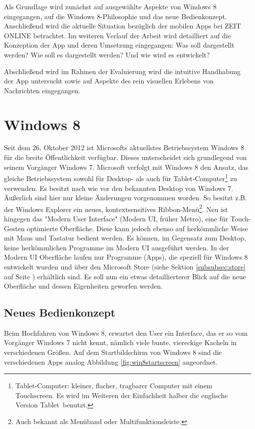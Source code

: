 \documentclass[12pt,a4paper,bibtotoc,abstracton]{scrartcl}
\begin{document}
Als Grundlage wird zunächst auf ausgewählte Aspekte von Windows 8 eingegangen, auf die Windows 8-Philosophie und das neue Bedienkonzept. Anschließend wird die aktuelle Situation bezüglich der mobilen Apps bei ZEIT ONLINE betrachtet. Im weiteren Verlauf der Arbeit wird detailliert auf die Konzeption der App und deren Umsetzung eingegangen: Was soll dargestellt werden? Wie soll es dargestellt werden? Und wie wird es entwickelt?

Abschließend wird im Rahmen der Evaluierung wird die intuitive Handhabung der App untersucht sowie auf Aspekte des rein visuellen Erlebens von Nachrichten eingegangen.



\newpage
\section{Windows 8}
\label{sec:windows8}
Seit dem 26. Oktober 2012 ist Microsofts aktuellstes Betriebssystem Windows 8 für die breite Öffentlichkeit verfügbar. Dieses unterscheidet sich grundlegend von seinem Vorgänger Windows 7. Microsoft verfolgt mit Windows 8 den Ansatz, das gleiche Betriebssystem sowohl für Desktop- als auch für Tablet-Computer\footnote{Tablet-Computer: kleiner, flacher, tragbarer Computer mit einem Touchscreen. Es wird im Weiteren der Einfachheit halber die englische Version \glqq Tablet\grqq\ benutzt.} zu verwenden. Es besitzt nach wie vor den bekannten Desktop von Windows 7. Äußerlich sind hier nur kleine Änderungen vorgenommen worden. So besitzt z.B. der Windows Explorer ein neues, kontextsensitives Ribbon-Menü\footnote{Auch bekannt als Menüband oder Multifunktionsleiste.}. Neu ist hingegen das "Modern User Interface" (Modern UI, früher Metro), eine für Touch-Gesten optimierte Oberfläche. Diese kann jedoch ebenso auf herkömmliche Weise mit Maus und Tastatur bedient werden. Es können, im Gegensatz zum Desktop, keine herkömmlichen Programme im Modern UI ausgeführt werden. In der Modern UI Oberfläche laufen nur Programme (Apps), die speziell für Windows 8 entwickelt wurden und über den Microsoft Store (siehe Sektion \ref{subsubsec:store} auf Seite \pageref{subsubsec:store}) erhältlich sind. Es soll nun ein etwas detaillierterer Blick auf die neue Oberfläche und dessen Eigenheiten geworfen werden.

\subsection{Neues Bedienkonzept}
\label{subsec:bedienkonzept}
Beim Hochfahren von Windows 8, erwartet den User ein Interface, das er so vom Vorgänger Windows 7 nicht kennt, nämlich viele bunte, viereckige Kacheln in verschiedenen Größen. Auf dem Startbildschirm von Windows 8 sind die verschiedenen Apps analog Abbildung \ref{fig:win8startscreen} angeordnet.
\end{document}
